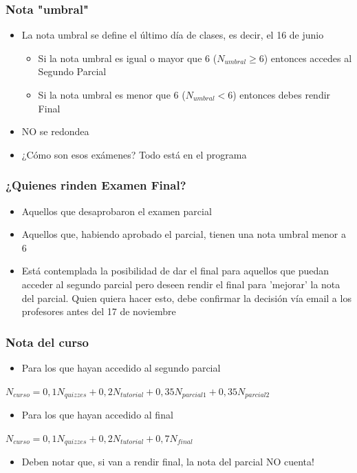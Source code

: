 \documentclass{beamer}
\begin{document}
\begin{frame}
\frametitle{Nota "umbral"}
\begin{itemize}
    \item La nota umbral se define el último día de clases, es decir, el 16 de junio      
    \begin{itemize}
            \item Si la nota umbral es igual o mayor que 6 ($N_{umbral} \geq 6$) entonces accedes al Segundo Parcial
            \item Si la nota umbral es menor que 6 ($N_{umbral} < 6$) entonces debes rendir Final       
            \end{itemize}
    \item NO se redondea
    \item ¿Cómo son esos exámenes? Todo está en el programa
            \end{itemize}
\end{frame}

\begin{frame}
\frametitle{¿Quienes rinden Examen Final?}
\begin{itemize}
    \item Aquellos que desaprobaron el examen parcial
    \item Aquellos que, habiendo aprobado el parcial, tienen una nota umbral menor a 6
    \item Está contemplada la posibilidad de dar el final para aquellos que puedan acceder al segundo parcial pero deseen rendir el final para 'mejorar' la nota del parcial. Quien quiera hacer esto, debe confirmar la decisión vía email a los profesores antes del 17 de noviembre
\end{itemize}
\end{frame}

\begin{frame}
\frametitle{Nota del curso}
\small
\begin{itemize}
    \item Para los que hayan accedido al segundo parcial \\
\end{itemize}
\begin{center}
 {$N_{curso}=0,1N_{quizzes}+0,2N_{tutorial}+0,35N_{parcial 1}+0,35N_{parcial 2}$}   
\end{center}

\begin{itemize}
    \item Para los que hayan accedido al final
\end{itemize}
\begin{center}
  {$N_{curso}=0,1N_{quizzes}+0,2N_{tutorial}+0,7N_{final}$}   
\end{center}

\begin{itemize}    
    \item Deben notar que, si van a rendir final, la nota del parcial NO cuenta!
\end{itemize}
\end{frame}
\end{document}
